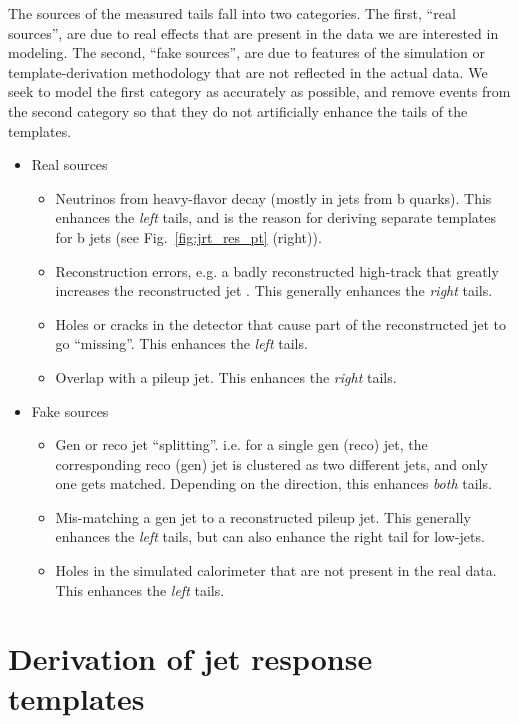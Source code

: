 The sources of the measured tails fall into two categories. The first, ``real sources'', 
are due to real effects that are present in the data we are interested in modeling. 
The second, ``fake sources'', are due to features of the simulation or template-derivation 
methodology that are not reflected in the actual data. 
We seek to model the first category as accurately as possible, 
and remove events from the second category so that
they do not artificially enhance the tails of the templates.
\begin{itemize}
\item{Real sources}
   \begin{itemize}
   \item Neutrinos from heavy-flavor decay (mostly in jets from b quarks). This enhances the \emph{left} tails, and is the
   reason for deriving separate templates for b jets (see Fig.~\ref{fig:jrt_res_pt} (right)).
   \item Reconstruction errors, e.g. a badly reconstructed high-\pt track that greatly increases the reconstructed jet \pt. This generally enhances the \emph{right} tails.
   \item Holes or cracks in the detector that cause part of the reconstructed jet to go ``missing''. This enhances the \emph{left} tails.
   \item Overlap with a pileup jet. This enhances the \emph{right} tails.
   \end{itemize}
\item{Fake sources}
   \begin{itemize}
   \item Gen or reco jet ``splitting''. i.e. for a single gen (reco) jet, the corresponding reco (gen) jet is clustered as two different jets, and only one gets matched. 
   Depending on the direction, this enhances \emph{both} tails.
   \item Mis-matching a gen jet to a reconstructed pileup jet. This generally enhances the \emph{left} tails,
     but can also enhance the right tail for low-\pt jets.
   \item Holes in the simulated calorimeter that are not present in the real data. This enhances the \emph{left} tails.
   \end{itemize}
\end{itemize}


\section{Derivation of jet response templates}
\label{sec:jrt}

